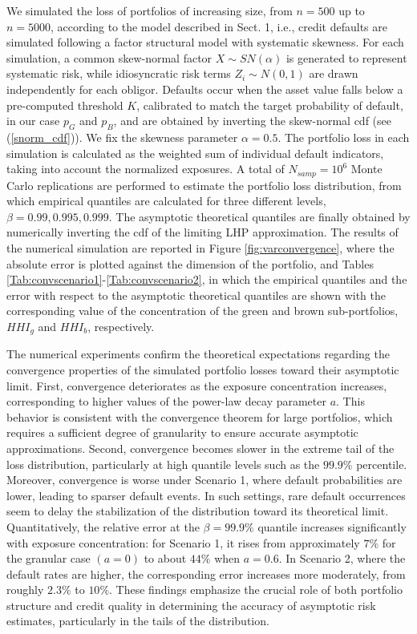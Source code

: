 \documentclass[preprint,12pt]{article}
\begin{document}
We simulated the loss of portfolios of increasing size, from $n=500$ up to $n=5000$, according to the model described in Sect. 1, i.e., credit defaults are simulated following a factor structural model with systematic skewness. For each simulation, a common skew-normal factor $X\sim SN(\alpha)$ is generated to represent systematic risk, while idiosyncratic risk terms $Z_i \sim N(0,1)$ are drawn independently for each obligor. Defaults occur when the asset value falls below a pre-computed threshold $K$, calibrated to match the target probability of default, in our case $p_G$ and $p_B$, and are obtained by inverting the skew-normal cdf (see (\ref{snorm_cdf})). We fix the skewness parameter $\alpha = 0.5$. The portfolio loss in each simulation is calculated as the weighted sum of individual default indicators, taking into account the normalized exposures.
A total of $N_{samp}=10^{6}$  Monte Carlo replications are performed to estimate the portfolio loss distribution, from which empirical quantiles are calculated for three different levels, $\beta = 0.99, 0.995, 0.999$. The asymptotic theoretical quantiles are finally obtained by numerically inverting the cdf of the limiting LHP approximation. 
The results of the numerical simulation are reported in Figure \ref{fig:varconvergence}, where the absolute error is plotted against the dimension of the portfolio, and Tables \ref{Tab:convscenario1}-\ref{Tab:convscenario2}, in which the empirical quantiles and the error with respect to the asymptotic theoretical quantiles are shown with the corresponding value of the concentration of the green and brown sub-portfolios, $HHI_g$ and $HHI_b$, respectively. 

The numerical experiments confirm the theoretical expectations regarding the convergence properties of the simulated portfolio losses toward their asymptotic limit. First, convergence deteriorates as the exposure concentration increases, corresponding to higher values of the power-law decay parameter $a$. This behavior is consistent with the convergence theorem for large portfolios, which requires a sufficient degree of granularity to ensure accurate asymptotic approximations. Second, convergence becomes slower in the extreme tail of the loss distribution, particularly at high quantile levels such as the $99.9\%$ percentile. Moreover, convergence is worse under Scenario 1, where default probabilities are lower, leading to sparser default events. In such settings, rare default occurrences seem to delay the stabilization of the distribution toward its theoretical limit. Quantitatively, the relative error at the $\beta = 99.9\%$ quantile increases significantly with exposure concentration: for Scenario 1, it rises from approximately $7\%$ for the granular case $(a=0)$ to about $44\%$ when $a=0.6$. In Scenario 2, where the default rates are higher, the corresponding error increases more moderately, from roughly $2.3\%$ to $10\%$. These findings emphasize the crucial role of both portfolio structure and credit quality in determining the accuracy of asymptotic risk estimates, particularly in the tails of the distribution.
\end{document}
